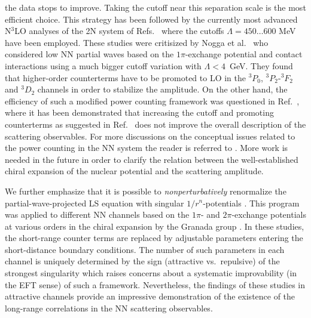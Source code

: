 \documentclass[aps,rmp,nofootinbib,twocolumn,floatfix]{revtex4}
\begin{document}
the data stops to improve. Taking the cutoff near this separation scale is the
most efficient choice. This strategy has been followed by the currently
most advanced N$^3$LO analyses of the 2N system of
Refs.~\cite{Entem:2003ft,Epelbaum:2004fk} where the cutoffs $\Lambda = 450
\ldots 600$ MeV have been employed. These studies were critisized by Nogga et
al.~\cite{Nogga:2005hy} who considered low NN partial waves based on the 
$1\pi$-exchange
potential and contact interactions using a much bigger cutoff variation with
$\Lambda < 4$~GeV. They found that higher-order counterterms have to be
promoted to LO in the $^3P_0$, $^3P_2$-$^3F_2$ and $^3D_2$ channels in order
to stabilize the amplitude. On the other hand, the efficiency of such a
modified power counting framework was questioned in 
Ref.~\cite{Epelbaum:2006pt}, where it has
been demonstrated that increasing the cutoff and promoting counterterms as
suggested in Ref.~\cite{Nogga:2005hy}
does not improve the overall description of the scattering observables. 
For more discussions on the conceptual issues related to the
power counting in the NN system the reader is referred to
\cite{Lepage:1997,Lepage:2000,Gegelia:2004pz,Nogga:2005hy,Epelbaum:2006pt,
Birse:2005um,Long:2007vp,Birse:2007sx}. More work is
needed in the future in order to clarify the relation between 
the well-established chiral expansion of the nuclear potential and 
the scattering amplitude.  

We further emphasize that it is possible to \emph{nonperturbatively}
renormalize the partial-wave-projected LS equation with
singular $1/r^n$-potentials
\cite{Beane:2000wh,Bawin:2003dm,Braaten:2004pg,Barford:2004fz,
Hammer:2005sa,Long:2007vp}.
This program was applied to different NN channels
based on the $1\pi$- and $2\pi$-exchange potentials
at various orders in the chiral expansion by the Granada group
\cite{PavonValderrama:2003np,PavonValderrama:2004nb,PavonValderrama:2005gu,
PavonValderrama:2005wv,PavonValderrama:2005uj,Higa:2007gz,Entem:2007jg,Valderrama:2008kj}. 
In these studies, the short-range counter
terms are replaced by adjustable parameters entering the short-distance boundary
conditions. The number of such parameters in each channel is uniquely
determined by the sign (attractive vs.~repulsive) of the strongest
singularity which raises concerns about a systematic improvability (in the EFT
sense) of such a framework. Nevertheless, the findings 
of these studies in attractive channels provide an impressive demonstration of
the existence of the long-range correlations in the NN scattering
observables. 
\end{document}
